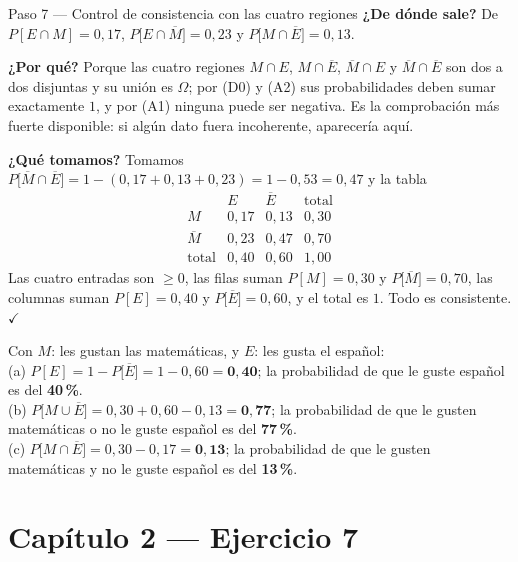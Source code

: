 \documentclass[11pt]{article}
\begin{document}
\begin{sol}
\begin{paso}{Paso 7 --- Control de consistencia con las cuatro regiones}
\textbf{¿De dónde sale?} De $P[E\cap M]=0{,}17$, $P\big[E\cap\overline{M}\big]=0{,}23$ y
$P\big[M\cap\overline{E}\big]=0{,}13$.

\textbf{¿Por qué?} Porque las cuatro regiones $M\cap E$, $M\cap\overline{E}$,
$\overline{M}\cap E$ y $\overline{M}\cap\overline{E}$ son dos a dos disjuntas y su unión es
$\Omega$; por (D0) y (A2) sus probabilidades deben sumar exactamente $1$, y por (A1) ninguna
puede ser negativa. Es la comprobación más fuerte disponible: si algún dato fuera incoherente,
aparecería aquí.

\textbf{¿Qué tomamos?} Tomamos
$P\big[\overline{M}\cap\overline{E}\big]=1-(0{,}17+0{,}13+0{,}23)=1-0{,}53=0{,}47$ y la tabla
\[
\begin{array}{c|cc|c}
 & E & \overline{E} & \text{total}\\\hline
M & 0{,}17 & 0{,}13 & 0{,}30\\
\overline{M} & 0{,}23 & 0{,}47 & 0{,}70\\\hline
\text{total} & 0{,}40 & 0{,}60 & 1{,}00
\end{array}
\]
Las cuatro entradas son $\ge 0$, las filas suman $P[M]=0{,}30$ y $P\big[\overline{M}\big]=0{,}70$,
las columnas suman $P[E]=0{,}40$ y $P\big[\overline{E}\big]=0{,}60$, y el total es $1$. Todo es
consistente. $\checkmark$
\end{paso}

\end{sol}

\begin{resp}
Con $M$: les gustan las matemáticas, y $E$: les gusta el español:\\[4pt]
(a) $P[E]=1-P\big[\overline{E}\big]=1-0{,}60=\mathbf{0{,}40}$; la probabilidad de que le guste
español es del \textbf{40\,\%}.\\[4pt]
(b) $P\big[M\cup\overline{E}\big]=0{,}30+0{,}60-0{,}13=\mathbf{0{,}77}$; la probabilidad de que
le gusten matemáticas o no le guste español es del \textbf{77\,\%}.\\[4pt]
(c) $P\big[M\cap\overline{E}\big]=0{,}30-0{,}17=\mathbf{0{,}13}$; la probabilidad de que le
gusten matemáticas y no le guste español es del \textbf{13\,\%}.
\end{resp}

\section*{Capítulo 2 --- Ejercicio 7}
\end{document}
